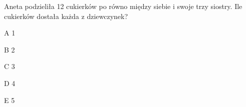 \begin{tresc}
Aneta podzieliła 12 cukierków po równo między siebie i swoje trzy siostry. Ile cukierków dostała każda z dziewczynek?
\end{tresc}
\begin{wariant}{A} 1 \end{wariant}
\begin{wariant}{B} 2 \end{wariant}
\begin{wariant}{C} 3 \end{wariant}
\begin{wariant}{D} 4 \end{wariant}
\begin{wariant}{E} 5 \end{wariant}
